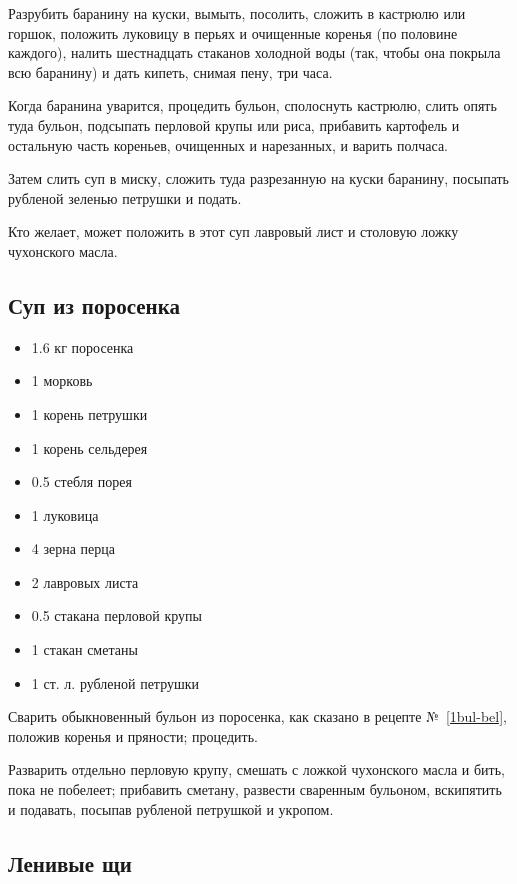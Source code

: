 Разрубить баранину на куски, вымыть, посолить, сложить в кастрюлю или горшок, положить луковицу в перьях и очищенные коренья (по половине каждого), налить шестнадцать стаканов холодной воды (так, чтобы она покрыла всю баранину) и дать кипеть, снимая пену, три часа.

Когда баранина уварится, процедить бульон, сполоснуть кастрюлю, слить опять туда бульон, подсыпать перловой крупы или риса, прибавить картофель и остальную часть кореньев, очищенных и нарезанных, и варить полчаса.

Затем слить суп в миску, сложить туда разрезанную на куски баранину, посыпать рубленой зеленью петрушки и подать.

Кто желает, может положить в этот суп лавровый лист и столовую ложку чухонского масла.

\subsection{Суп из поросенка}\label{22sup-poros}

\begin{itemize}
	\item 1.6 кг поросенка 
	\item 1 морковь 
	\item 1 корень петрушки 
	\item 1 корень сельдерея 
	\item 0.5 стебля порея 
	\item 1 луковица 
	\item 4 зерна перца 
	\item 2 лавровых листа 
	\item 0.5 стакана перловой крупы 
	\item 1 стакан сметаны 
	\item 1 ст. л. рубленой петрушки
\end{itemize}

Сварить обыкновенный бульон из поросенка, как сказано в рецепте №~\ref{1bul-bel}, положив коренья и пряности; процедить.

Разварить отдельно перловую крупу, смешать с ложкой чухонского масла и бить, пока не побелеет; прибавить сметану, развести сваренным бульоном, вскипятить и подавать, посыпав рубленой петрушкой и укропом.

\subsection{Ленивые щи}\label{23len-schi}

